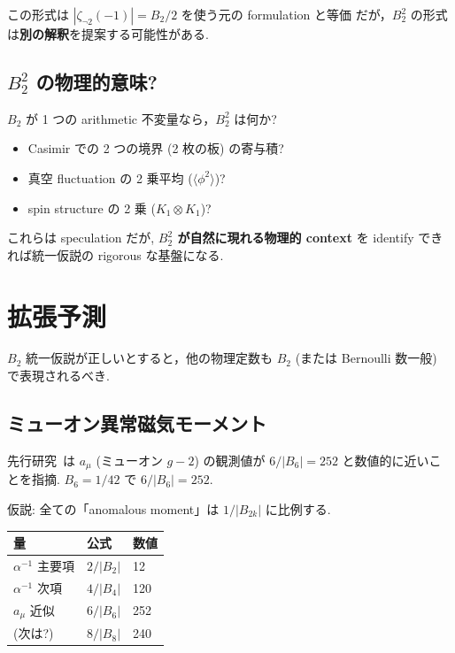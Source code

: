 \documentclass[11pt,a4paper]{article}
\begin{document}
この形式は $|\zeta_{\neg 2}(-1)| = B_2/2$ を使う元の formulation と等価
だが，$B_2^2$ の形式は\textbf{別の解釈}を提案する可能性がある.

\subsection{$B_2^2$ の物理的意味?}

$B_2$ が 1 つの arithmetic 不変量なら，$B_2^2$ は何か?
\begin{itemize}
\item Casimir での 2 つの境界 (2 枚の板) の寄与積?
\item 真空 fluctuation の 2 乗平均 ($\langle \phi^2 \rangle$)?
\item spin structure の 2 乗 ($K_1 \otimes K_1$)?
\end{itemize}

これらは speculation だが, \textbf{$B_2^2$ が自然に現れる物理的
context} を identify できれば統一仮説の rigorous な基盤になる.

\section{拡張予測}

$B_2$ 統一仮説が正しいとすると，他の物理定数も $B_2$ (または
Bernoulli 数一般) で表現されるべき.

\subsection{ミューオン異常磁気モーメント}

先行研究~\cite{muonG2}は $a_\mu$ (ミューオン $g-2$) の観測値が
$6/|B_6| = 252$ と数値的に近いことを指摘. $B_6 = 1/42$ で $6/|B_6| = 252$.

仮説: 全ての「anomalous moment」は $1/|B_{2k}|$ に比例する.

\begin{center}
\begin{tabular}{lll}
\toprule
量 & 公式 & 数値 \\
\midrule
$\alpha^{-1}$ 主要項 & $2/|B_2|$ & 12 \\
$\alpha^{-1}$ 次項 & $4/|B_4|$ & 120 \\
$a_\mu$ 近似 & $6/|B_6|$ & 252 \\
(次は?) & $8/|B_8|$ & 240 \\
\bottomrule
\end{tabular}
\end{center}
\end{document}
